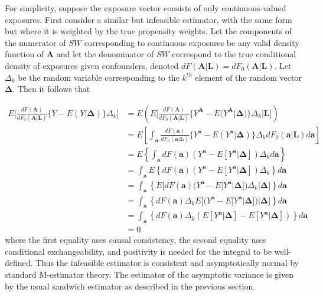 \documentclass[12pt]{article}
\begin{document}
For simplicity, suppose the exposure vector consists of only continuous-valued exposures. First consider a similar but infeasible estimator, with the same form but where it is weighted by the true propensity weights. Let the components of the numerator of $SW$ corresponding to continuous exposures be any valid density function of $\bm{A}$ and let the denominator of $SW$ correspond to the true conditional density of exposures given confounders, denoted $dF(\bm{A} | \bm{L}) = dF_{0}(\bm{A} | \bm{L})$. Let $\Delta_{k}$ be the random variable corresponding to the $k^{th}$ element of the random vector $\bm{\Delta}$. Then it follows that

\begin{align*}
E \bigg[\frac{dF(\bm{A})}{dF_{0}(\bm{A} | \bm{L})} \{ Y - E(Y | \bm{\Delta})\} \Delta_{k} \bigg] &= E \left( E \bigg[\frac{dF(\bm{A})}{dF_{0}(\bm{A} | \bm{L})} \{ Y^{\bm{A}} - E(Y^{\bm{A}} | \bm{\Delta}) \} \Delta_{k} | \bm{L} \bigg] \right) \\
&= E \left [ \int_{\bm{a}} \frac{dF(\bm{a})}{dF_{0}(\bm{a} | \bm{L})}\{ Y^{\bm{a}} - E(Y^{\bm{a}} | \bm{\Delta}) \} \Delta_{k} dF_{0}(\bm{a} | \bm{L}) d\bm{a} \right ] \\
&= E \left \{ \int_{\bm{a}} dF(\bm{a})(Y^{\bm{a}} - E[Y^{\bm{a}} | \bm{\Delta}])\Delta_{k} d\bm{a} \right \} \\
&= \int_{\bm{a}} E \left \{ dF(\bm{a})(Y^{\bm{a}} - E[Y^{\bm{a}} | \bm{\Delta}])\Delta_{k} \right \} d\bm{a} \\
&= \int_{\bm{a}} \left \{ E \bigg[ dF(\bm{a})(Y^{\bm{a}} - E[Y^{\bm{a}} | \bm{\Delta}])\Delta_{k} | \bm{\Delta} \bigg] \right \} d\bm{a} \\
&= \int_{\bm{a}} \left \{ dF(\bm{a})\Delta_{k} E \bigg[ (Y^{\bm{a}} - E[Y^{\bm{a}} | \bm{\Delta}]) | \bm{\Delta} \bigg] \right \} d\bm{a}\\
&= \int_{\bm{a}} \left \{ dF(\bm{a})\Delta_{k} ( E[Y^{\bm{a}} | \bm{\Delta}] - E[Y^{\bm{a}} | \bm{\Delta}] ) \right \} d\bm{a} \\
&= 0
\end{align*}
where the first equality uses causal consistency, the second equality uses conditional exchangeability, and positivity is needed for the integral to be well-defined. Thus the infeasible estimator is consistent and asymptotically normal by standard M-estimator theory. The estimator of the asymptotic variance is given by the usual sandwich estimator as described in the previous section.
\end{document}

